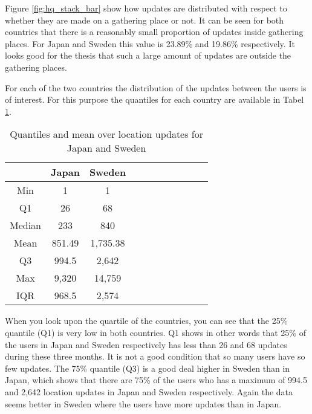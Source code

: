 Figure \ref{fig:hq_stack_bar} show how updates are distributed with respect to whether they are made on a gathering place or not. It can be seen for both countries that there is a reasonably small proportion of updates inside gathering places. For Japan and Sweden this value is 23.89\% and 19.86\% respectively. 
It looks good for the thesis that such a large amount of updates are outside the gathering places. 

For each of the two countries the distribution of the updates between the users is of interest. For this purpose the quantiles for each country are available in Tabel \ref{tab:stat_loc_updates}. 


\begin{table}[htbp]
        \centering
        \small
        \setlength\tabcolsep{2pt}
        \begin{tabular}{|c|c|c|c|c|c|c|c|c|c|c|}
            \hline
                         & Japan      &   Sweden      \\[-1pt]
            \hline
                 Min     &    1       &   1           \\
            \hline
                 Q1      &  26        &   68      \\
            \hline
                 Median  & 233     &   840      \\
            \hline
                 Mean    &  851.49   &  1,735.38     \\
            \hline
                 Q3      & 994.5    &   2,642     \\
            \hline
                 Max     &  9,320 &  14,759     \\
            \hline
                 IQR     &  968.5   &   2,574     \\
            \hline
            
        \end{tabular}
        \caption{Quantiles and mean over location updates for Japan and Sweden} %
        \label{tab:stat_loc_updates}
\end{table}


When you look upon the quartile of the countries, you can see that the 25\% quantile (Q1) is very low in both countries. Q1 shows in other words that 25\% of the users in Japan and Sweden respectively has less than 26 and 68 updates during these three months. It is not a good condition that so many users have so few updates. The 75\% quantile (Q3) is a good deal higher in Sweden than in Japan, which shows that there are 75\% of the users who has a maximum of 994.5 and 2,642 location updates in Japan and Sweden respectively. Again the data seems better in Sweden where the users have more updates than in Japan. \\ 


